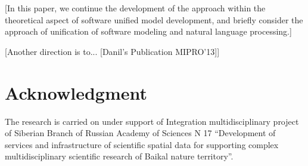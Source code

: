 \documentclass[conference]{IEEEtran}
\newcommand{\e}[2][fcolor]{\textcolor{pcolor}{[}\textcolor{#1}{#2}\textcolor{pcolor}{]}}
\begin{document}
\e{In this paper, we continue the development of the approach
\cite{fereferovDiss} within the theoretical aspect \cite{b2:15} of software unified model development, and briefly consider the approach of unification of software modeling and natural language processing.}

\e{Another direction is to... [Danil's Publication MIPRO'13]}



\section*{Acknowledgment}
The research is carried on under support of Integration multidisciplinary project of Siberian Branch of Russian Academy of Sciences N 17 “Development of services and infrastructure of scientific spatial data for supporting complex multidisciplinary scientific research of Baikal nature territory”.



\end{document}
